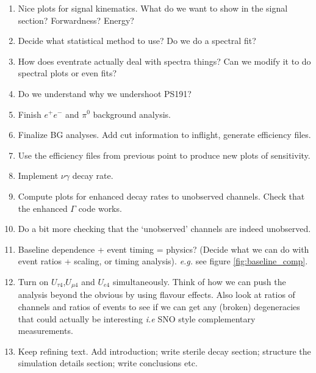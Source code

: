 \documentclass[11pt, a4paper]{article}
\begin{document}
\begin{enumerate}

\item Nice plots for signal kinematics. What do we want to show in the signal
section? Forwardness? Energy? 

\item Decide what statistical method to use? Do we do a spectral fit?

\item How does eventrate actually deal with spectra things? Can we modify it to 
do spectral plots or even fits?

\item Do we understand why we undershoot PS191?

\item Finish $e^+e^-$ and $\pi^0$ background analysis.

\item Finalize BG analyses. Add cut information to inflight, generate
efficiency files. 

\item Use the efficiency files from previous point to produce new plots of
sensitivity.

\item Implement $\nu\gamma$ decay rate. 

\item Compute plots for enhanced decay rates to unobserved channels. Check that
the enhanced $\Gamma$ code works.

\item Do a bit more checking that the `unobserved' channels are indeed unobserved.

\item Baseline dependence + event timing = physics? (Decide what we can do with
event ratios + scaling, or timing analysis).  \emph{e.g.} see figure
\ref{fig:baseline_comp}.

\item Turn on $U_{\tau 4}$,$U_{\mu 4}$ and $U_{e4}$ simultaneously. Think of
how we can push the analysis beyond the obvious by using flavour effects. Also
look at ratios of channels and ratios of events to see if we can get any
(broken) degeneracies that could actually be interesting \emph{i.e} SNO style
complementary measurements.

\item Keep refining text. Add introduction; write sterile decay section; structure 
the simulation details section; write conclusions etc.


\end{enumerate}
\end{document}
